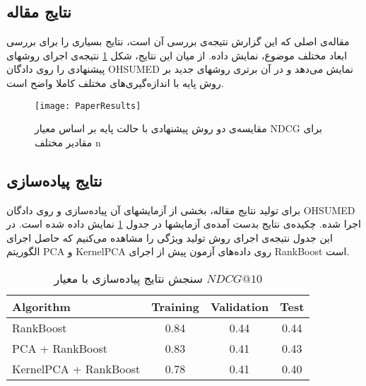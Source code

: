 \documentclass{article}
\begin{document}
 \subsection{نتایج مقاله}
مقاله‌ی اصلی که این گزارش نتیجه‌ی بررسی آن است، نتایج بسیاری را برای بررسی ابعاد مختلف موضوع، نمایش داده. از میان این نتایج، شکل \ref{fig:paperresults} نتیجه‌ی اجرای روشهای پیشنهادی را روی دادگان OHSUMED نمایش می‌دهد و در آن برتری روشهای جدید بر روش پایه با اندازه‌گیری‌های مختلف کاملا واضح است.

\begin{figure} \centerline{\texttt{[image: PaperResults]}} \caption{\label{fig:paperresults}
مقایسه‌ی دو روش پیشنهادی با حالت پایه بر اساس معیار NDCG برای مقادیر مختلف n 
 } \end{figure}
 
 \subsection{نتایج پیاده‌سازی}
برای تولید نتایج مقاله، بخشی از آزمایشهای آن پیاده‌سازی و روی دادگان OHSUMED اجرا شده. چکیده‌ی نتایج بدست آمده‌ی آزمایشها در جدول \ref{tab:implementationresults} نمایش داده شده است. در این جدول نتیجه‌ی اجرای روش تولید ویژگی را مشاهده می‌کنیم که حاصل اجرای الگوریتم PCA و KernelPCA روی داده‌های آزمون پیش از اجرای RankBoost است.

\begin{table}
\begin{latin} \begin{center} \begin{tabular} {l | c | c | c}
Algorithm & Training & Validation & Test \\
\hline
RankBoost & 0.84 & 0.44 & 0.44 \\
PCA + RankBoost & 0.83 & 0.41 & 0.43 \\
KernelPCA + RankBoost & 0.78 & 0.41 & 0.40 \\
\end{tabular} \end{center} \end{latin}
\caption{سنجش نتایج پیاده‌سازی با معیار $NDCG@10$}
\label{tab:implementationresults}
\end{table}
\end{document}

